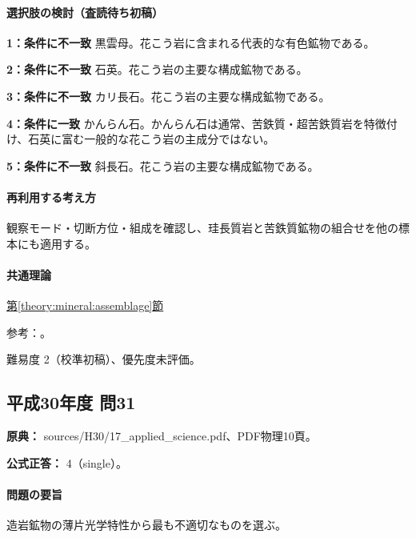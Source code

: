 \paragraph{選択肢の検討（査読待ち初稿）}\mbox{}\par

\noindent\textbf{1：条件に不一致} 黒雲母。花こう岩に含まれる代表的な有色鉱物である。\par

\noindent\textbf{2：条件に不一致} 石英。花こう岩の主要な構成鉱物である。\par

\noindent\textbf{3：条件に不一致} カリ長石。花こう岩の主要な構成鉱物である。\par

\noindent\textbf{4：条件に一致} かんらん石。かんらん石は通常、苦鉄質・超苦鉄質岩を特徴付け、石英に富む一般的な花こう岩の主成分ではない。\par

\noindent\textbf{5：条件に不一致} 斜長石。花こう岩の主要な構成鉱物である。\par

\paragraph{再利用する考え方} 観察モード・切断方位・組成を確認し、珪長質岩と苦鉄質鉱物の組合せを他の標本にも適用する。

\paragraph{共通理論} \hyperref[theory:mineral:assemblage]{第\ref*{theory:mineral:assemblage}節}

\par 参考：\cite{usgs_igneous_components,hom_forsterite}。

\par 難易度 2（校準初稿）、優先度未評価。

\subsection{平成30年度 問31}
\label{q:h30-reg-applied-31}

\noindent\textbf{原典：} sources/H30/17\_applied\_science.pdf、PDF物理10頁。

\textbf{公式正答：} 4（single）。

\paragraph{問題の要旨} 造岩鉱物の薄片光学特性から最も不適切なものを選ぶ。

